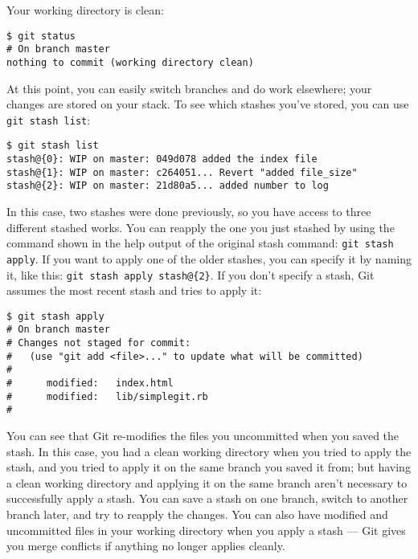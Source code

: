 \documentclass[a4paper]{book}
\begin{document}
Your working directory is clean:

\begin{shaded}\begin{verbatim}
$ git status
# On branch master
nothing to commit (working directory clean)
\end{verbatim}\end{shaded}

At this point, you can easily switch branches and do work elsewhere; your changes are stored on your stack. To see which stashes you've stored, you can use \texttt{git stash list}:

\begin{shaded}\begin{verbatim}
$ git stash list
stash@{0}: WIP on master: 049d078 added the index file
stash@{1}: WIP on master: c264051... Revert "added file_size"
stash@{2}: WIP on master: 21d80a5... added number to log
\end{verbatim}\end{shaded}

In this case, two stashes were done previously, so you have access to three different stashed works. You can reapply the one you just stashed by using the command shown in the help output of the original stash command: \texttt{git stash apply}. If you want to apply one of the older stashes, you can specify it by naming it, like this: \texttt{git stash apply stash@\{2\}}. If you don't specify a stash, Git assumes the most recent stash and tries to apply it:

\begin{shaded}\begin{verbatim}
$ git stash apply
# On branch master
# Changes not staged for commit:
#   (use "git add <file>..." to update what will be committed)
#
#      modified:   index.html
#      modified:   lib/simplegit.rb
#
\end{verbatim}\end{shaded}

You can see that Git re-modifies the files you uncommitted when you saved the stash. In this case, you had a clean working directory when you tried to apply the stash, and you tried to apply it on the same branch you saved it from; but having a clean working directory and applying it on the same branch aren't necessary to successfully apply a stash. You can save a stash on one branch, switch to another branch later, and try to reapply the changes. You can also have modified and uncommitted files in your working directory when you apply a stash --- Git gives you merge conflicts if anything no longer applies cleanly.
\end{document}
